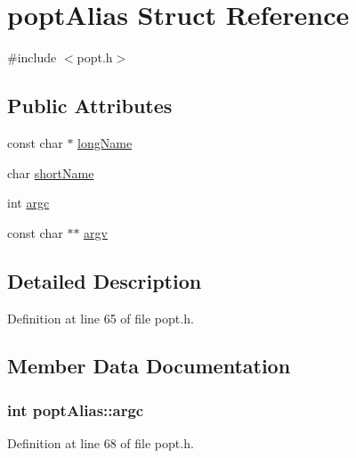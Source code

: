 \hypertarget{structpopt_alias}{}\section{popt\+Alias Struct Reference}
\label{structpopt_alias}


{\ttfamily \#include $<$popt.\+h$>$}

\subsection*{Public Attributes}
\begin{DoxyCompactItemize}
\item 
const char $\ast$ \hyperlink{structpopt_alias_a92907c8fe8d1a61b281c21a4c724b7e6}{long\+Name}
\item 
char \hyperlink{structpopt_alias_acc11957cb38d95c51ef7ab5ef75ef7bf}{short\+Name}
\item 
int \hyperlink{structpopt_alias_a61d854f4dc7da46c44ec034b93f5968e}{argc}
\item 
const char $\ast$$\ast$ \hyperlink{structpopt_alias_a80b40d2518a74014cf4dbbd5980e90a6}{argv}
\end{DoxyCompactItemize}


\subsection{Detailed Description}


Definition at line 65 of file popt.\+h.



\subsection{Member Data Documentation}
\hypertarget{structpopt_alias_a61d854f4dc7da46c44ec034b93f5968e}{}
\subsubsection[{argc}]{\setlength{\rightskip}{0pt plus 5cm}int popt\+Alias\+::argc}\label{structpopt_alias_a61d854f4dc7da46c44ec034b93f5968e}


Definition at line 68 of file popt.\+h.

\hypertarget{structpopt_alias_a80b40d2518a74014cf4dbbd5980e90a6}{}

